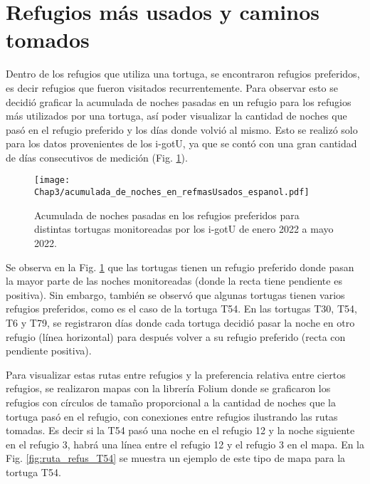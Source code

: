 \section{Refugios más usados y caminos tomados}
Dentro de los refugios que utiliza una tortuga, se encontraron refugios preferidos, es decir refugios que fueron visitados recurrentemente. Para observar esto se decidió graficar la acumulada de noches pasadas en un refugio para los refugios más utilizados por una tortuga, así poder visualizar la cantidad de noches que pasó en el refugio preferido y los días donde volvió al mismo. Esto se realizó solo para los datos provenientes de los i-gotU, ya que se contó con una gran cantidad de días consecutivos de medición (Fig. \ref{fig:refugios_preferidos}). 
\begin{figure}[ht]
    \begin{center}
        \texttt{[image: Chap3/acumulada\_de\_noches\_en\_refmasUsados\_espanol.pdf]}
        \caption[Acumulada de noches pasadas en los refugios preferidos.]{Acumulada de noches pasadas en los refugios preferidos para distintas tortugas monitoreadas por los i-gotU de enero 2022 a mayo 2022.}
        \label{fig:refugios_preferidos}
       
        \end{center}
\end{figure}
Se observa en la Fig. \ref{fig:refugios_preferidos} que las tortugas tienen un refugio preferido donde pasan la mayor parte de las noches monitoreadas (donde la recta tiene pendiente es positiva). Sin embargo, también se observó que algunas tortugas tienen varios refugios preferidos, como es el caso de la tortuga T54. En las tortugas T30, T54, T6 y T79, se registraron días donde cada tortuga decidió pasar la noche en otro refugio (línea horizontal) para después volver a su refugio preferido (recta con pendiente positiva). 

Para visualizar estas rutas entre refugios y la preferencia relativa entre ciertos refugios, se realizaron mapas con la librería Folium donde se graficaron los refugios con círculos de tamaño proporcional a la cantidad de noches que la tortuga pasó en el refugio, con conexiones entre refugios ilustrando las rutas tomadas. Es decir si la T54 pasó una noche en el refugio 12 y la noche siguiente en el refugio 3, habrá una línea entre el refugio 12 y el refugio 3 en el mapa. En la Fig. \ref{fig:ruta_refus_T54} se muestra un ejemplo de este tipo de mapa para la tortuga T54.
 
